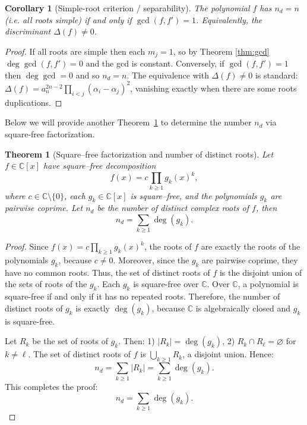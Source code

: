 \documentclass[11pt]{article}
\newtheorem{theorem}{Theorem}
\newtheorem{corollary}{Corollary}
\begin{document}
\begin{corollary}[Simple-root criterion / separability]
The polynomial \(f\) has \(n_d=n\) (i.e. all roots simple) if and only if \(\gcd(f,f')=1\). Equivalently, the discriminant \(\Delta(f)\neq 0\).
\end{corollary}

\begin{proof}
If all roots are simple then each \(m_j=1\), so by Theorem \ref{thm:gcd} \(\deg\gcd(f,f')=0\) and the gcd is constant.  Conversely, if \(\gcd(f,f')=1\) then \(\deg\gcd=0\) and so \(n_d=n\).  The equivalence with \(\Delta(f)\neq0\) is standard: \(\Delta(f)=a_n^{2n-2}\prod_{i<j}(\alpha_i-\alpha_j)^2\), vanishing exactly when there are some roots duplications.
\end{proof}

Below we will provide another Theorem~\ref{thm:square free fac for n d} to determine the number $n_d$ via square-free factorization.
%
\begin{theorem}[Square--free factorization and number of distinct roots]\label{thm:square free fac for n d}
Let \(f\in\mathbb{C}[x]\) have square--free decomposition
\[
f(x)=c\prod_{k\ge1} g_k(x)^k,
\]
where \(c\in\mathbb{C}\setminus\{0\}\), each \(g_k\in\mathbb{C}[x]\) is square--free, and the polynomials \(g_k\) are pairwise coprime.  Let \(n_d\) be the number of distinct complex roots of \(f\), then
\[
n_d=\sum_{k\ge1}\deg(g_k).
\]
\end{theorem}

\begin{proof}
%
Since \( f(x) = c \prod_{k \ge 1} g_k(x)^k \), the roots of \( f \) are exactly the roots of the polynomials \( g_k \), because \( c \neq 0 \). Moreover, since the \( g_k \) are pairwise coprime, they have no common roots.  Thus, the set of distinct roots of \( f \) is the disjoint union of the sets of roots of the \( g_k \). Each \( g_k \) is square-free over \( \mathbb{C} \).  Over \( \mathbb{C} \), a polynomial is square-free if and only if it has no repeated roots.  Therefore, the number of distinct roots of \( g_k \) is exactly \( \deg(g_k) \), because \( \mathbb{C} \) is algebraically closed and \( g_k \) is square-free.

Let \( R_k \) be the set of roots of \( g_k \). Then: 1) \( |R_k| = \deg(g_k) \), 2) \( R_k \cap R_\ell = \varnothing \) for \( k \ne \ell \). The set of distinct roots of \( f \) is \( \bigcup_{k \ge 1} R_k \), a disjoint union. Hence:
\[
n_d = \sum_{k \ge 1} |R_k| = \sum_{k \ge 1} \deg(g_k).
\]
%
This completes the proof:
\[
n_d = \sum_{k \ge 1} \deg(g_k).
\]
%
\end{proof}
\end{document}
